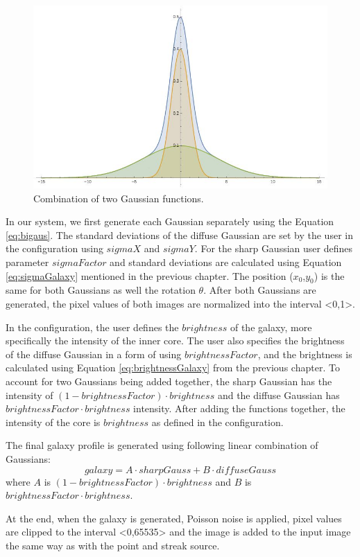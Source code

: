 \begin{figure}[h]
    \centering
    \includegraphics[width=.7\textwidth]{images/gaussians.JPG}
    \caption{Combination of two Gaussian functions.}
    \label{img:gaussTwo}
\end{figure}

In our system, we first generate each Gaussian separately using the Equation \ref{eq:bigaus}. The standard deviations of the diffuse Gaussian are set by the user in the configuration using $sigmaX$ and $sigmaY$. For the sharp Gaussian user defines parameter $sigmaFactor$ and standard deviations are calculated using Equation \ref{eq:sigmaGalaxy} mentioned in the previous chapter. The position ($x_0$,$y_0$) is the same for both Gaussians as well the rotation $\theta$. After both Gaussians are generated, the pixel values of both images are normalized into the interval <0,1>. 

In the configuration, the user defines the $brightness$ of the galaxy, more specifically the intensity of the inner core. The user also specifies the brightness of the diffuse Gaussian in a form of using $brightnessFactor$, and the brightness is calculated using Equation \ref{eq:brightnessGalaxy} from the previous chapter. 
To account for two Gaussians being added together, the sharp Gaussian has the intensity of $(1 - brightnessFactor) \cdot brightness$ and the diffuse Gaussian has $brightnessFactor \cdot brightness$ intensity. After adding the functions together, the intensity of the core is $brightness$ as defined in the configuration. 

The final galaxy profile is generated using following linear combination of Gaussians:
\begin{equation}
    galaxy = A \cdot sharpGauss + B \cdot diffuseGauss
\end{equation}
where $A$ is $(1 - brightnessFactor) \cdot brightness$ and $B$ is $brightnessFactor \cdot brightness$. 

At the end, when the galaxy is generated, Poisson noise is applied, pixel values are clipped to the interval <0,65535> and the image is added to the input image the same way as with the point and streak source. 

